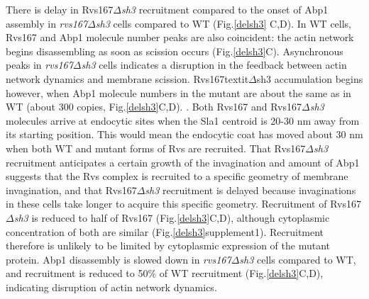 \documentclass[9pt,lineno]{elife}
\begin{document}
There is delay in Rvs167\textit{$\Delta$sh3} recruitment compared to the onset of Abp1 assembly in \textit{rvs167$\Delta$sh3} cells compared to WT (Fig.\ref{delsh3} C,D). In WT cells, Rvs167 and Abp1 molecule number peaks are also coincident: the actin network begins disassembling as soon as scission occurs (Fig.\ref{delsh3}C). Asynchronous peaks in \textit{rvs167$\Delta$sh3} cells indicates a disruption in the feedback between actin network dynamics and membrane scission. Rvs167textit{$\Delta$sh3} accumulation begins however, when Abp1 molecule numbers in the mutant are about the same as in WT (about 300 copies, Fig.\ref{delsh3}C,D). . Both Rvs167 and Rvs167\textit{$\Delta$sh3} molecules arrive at endocytic sites when the Sla1 centroid is 20-30 nm away from its starting position. This would mean the endocytic coat has moved about 30 nm when both WT and mutant forms of Rvs are recruited. That Rvs167\textit{$\Delta$sh3} recruitment anticipates a certain growth of the invagination and amount of Abp1 suggests that the Rvs complex is recruited to a specific geometry of membrane invagination, and that Rvs167\textit{$\Delta$sh3} recruitment is delayed because invaginations in these cells take longer to acquire this specific geometry. Recruitment of Rvs167\textit{$\Delta$sh3}  is reduced to half of Rvs167 (Fig.\ref{delsh3}C,D), although cytoplasmic concentration of both are similar (Fig.\ref{delsh3}supplement1). Recruitment therefore is unlikely to be limited by cytoplasmic expression of the mutant protein. Abp1 disassembly is slowed down in \textit{rvs167$\Delta$sh3} cells compared to WT, and recruitment is reduced to 50\% of WT recruitment (Fig.\ref{delsh3}C,D), indicating disruption of actin network dynamics.

	
\end{document}
